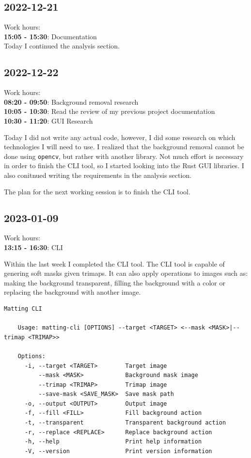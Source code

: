\documentclass{article}
\begin{document}
\subsection{2022-12-21}

Work hours:\\
\textbf{15:05 - 15:30}: Documentation \\

Today I continued the analysis section.

\subsection{2022-12-22}

Work hours:\\
\textbf{08:20 - 09:50}: Background removal research \\
\textbf{10:05 - 10:30}: Read the review of my previous project documentation \\
\textbf{10:30 - 11:20}: GUI Research

Today I did not write any actual code, however, I did some research on which
technologies I will need to use. I realized that the background removal
cannot be done using \texttt{opencv}, but rather with another library.
Not much effort is necessary in order to finish the CLI tool, so I started
looking into the Rust GUI libraries. I also conitnued writing the requirements
in the analysis section.

The plan for the next working session is to finish the CLI tool.

\subsection{2023-01-09}

Work hours:\\
\textbf{13:15 - 16:30}: CLI

Within the last week I completed the CLI tool.
The CLI tool is capable of genering soft masks given trimaps.
It can also apply operations to images such as: making the background transparent,
filling the background with a color or replacing the background with another image.

\begin{lstlisting}[style=generic]
    Matting CLI
    
    Usage: matting-cli [OPTIONS] --target <TARGET> <--mask <MASK>|--trimap <TRIMAP>>
    
    Options:
      -i, --target <TARGET>        Target image
          --mask <MASK>            Background mask image
          --trimap <TRIMAP>        Trimap image
          --save-mask <SAVE_MASK>  Save mask path
      -o, --output <OUTPUT>        Output image
      -f, --fill <FILL>            Fill background action
      -t, --transparent            Transparent background action
      -r, --replace <REPLACE>      Replace background action
      -h, --help                   Print help information
      -V, --version                Print version information
\end{lstlisting}
\end{document}
